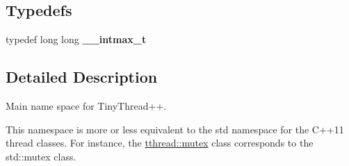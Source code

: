 \subsection*{Typedefs}
\begin{DoxyCompactItemize}
\item 
typedef long long {\bfseries \+\_\+\+\_\+intmax\+\_\+t}\hypertarget{namespacetthread_a8bafc3fb85fe4d09c9dbf4272142b6e9}{}\label{namespacetthread_a8bafc3fb85fe4d09c9dbf4272142b6e9}

\end{DoxyCompactItemize}


\subsection{Detailed Description}
Main name space for Tiny\+Thread++. 

This namespace is more or less equivalent to the {\ttfamily std} namespace for the C++11 thread classes. For instance, the \hyperlink{classtthread_1_1mutex}{tthread\+::mutex} class corresponds to the std\+::mutex class. 